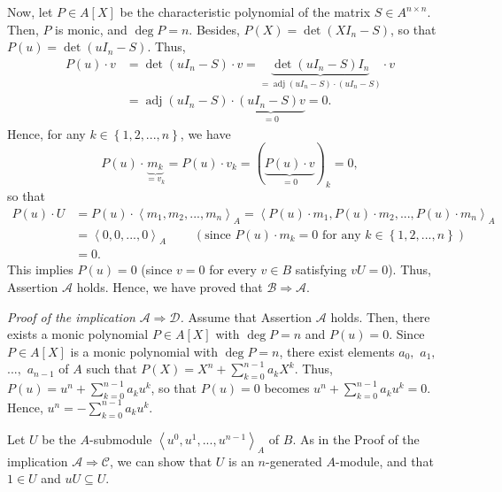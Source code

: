 \documentclass[12pt,final,notitlepage,onecolumn]{article}%
\begin{document}
Now, let $P\in A\left[  X\right]  $ be the characteristic polynomial of the
matrix $S\in A^{n\times n}$. Then, $P$ is monic, and $\deg P=n$. Besides,
$P\left(  X\right)  =\det\left(  XI_{n}-S\right)  $, so that $P\left(
u\right)  =\det\left(  uI_{n}-S\right)  $. Thus,%
\begin{align*}
P\left(  u\right)  \cdot v  &  =\det\left(  uI_{n}-S\right)  \cdot
v=\underbrace{\det\left(  uI_{n}-S\right)  I_{n}}_{=\operatorname{adj}\left(
uI_{n}-S\right)  \cdot\left(  uI_{n}-S\right)  }\cdot v\\
&  =\operatorname{adj}\left(  uI_{n}-S\right)  \cdot\underbrace{\left(
uI_{n}-S\right)  v}_{=0}=0.
\end{align*}
Hence, for any $k\in\left\{  1,2,...,n\right\}  $, we have%
\[
P\left(  u\right)  \cdot\underbrace{m_{k}}_{=v_{k}}=P\left(  u\right)  \cdot
v_{k}=\left(  \underbrace{P\left(  u\right)  \cdot v}_{=0}\right)  _{k}=0,
\]
so that%
\begin{align*}
P\left(  u\right)  \cdot U  &  =P\left(  u\right)  \cdot\left\langle
m_{1},m_{2},...,m_{n}\right\rangle _{A}=\left\langle P\left(  u\right)  \cdot
m_{1},P\left(  u\right)  \cdot m_{2},...,P\left(  u\right)  \cdot
m_{n}\right\rangle _{A}\\
&  =\left\langle 0,0,...,0\right\rangle _{A}\ \ \ \ \ \ \ \ \ \ \left(
\text{since }P\left(  u\right)  \cdot m_{k}=0\text{ for any }k\in\left\{
1,2,...,n\right\}  \right) \\
&  =0.
\end{align*}
This implies $P\left(  u\right)  =0$ (since $v=0$ for every $v\in B$
satisfying $vU=0$). Thus, Assertion $\mathcal{A}$ holds. Hence, we have proved
that $\mathcal{B}\Longrightarrow\mathcal{A}$.

\textit{Proof of the implication }$\mathcal{A}\Longrightarrow\mathcal{D}%
$\textit{.} Assume that Assertion $\mathcal{A}$ holds. Then, there exists a
monic polynomial $P\in A\left[  X\right]  $ with $\deg P=n$ and $P\left(
u\right)  =0$. Since $P\in A\left[  X\right]  $ is a monic polynomial with
$\deg P=n$, there exist elements $a_{0},$ $a_{1},$ $...,$ $a_{n-1}$ of $A$
such that $P\left(  X\right)  =X^{n}+\sum\limits_{k=0}^{n-1}a_{k}X^{k}$. Thus,
$P\left(  u\right)  =u^{n}+\sum\limits_{k=0}^{n-1}a_{k}u^{k}$, so that
$P\left(  u\right)  =0$ becomes $u^{n}+\sum\limits_{k=0}^{n-1}a_{k}u^{k}=0$.
Hence, $u^{n}=-\sum\limits_{k=0}^{n-1}a_{k}u^{k}$.

Let $U$ be the $A$-submodule $\left\langle u^{0},u^{1},...,u^{n-1}%
\right\rangle _{A}$ of $B$. As in the Proof of the implication $\mathcal{A}%
\Longrightarrow\mathcal{C}$, we can show that $U$ is an $n$-generated
$A$-module, and that $1\in U$ and $uU\subseteq U$.
\end{document}

